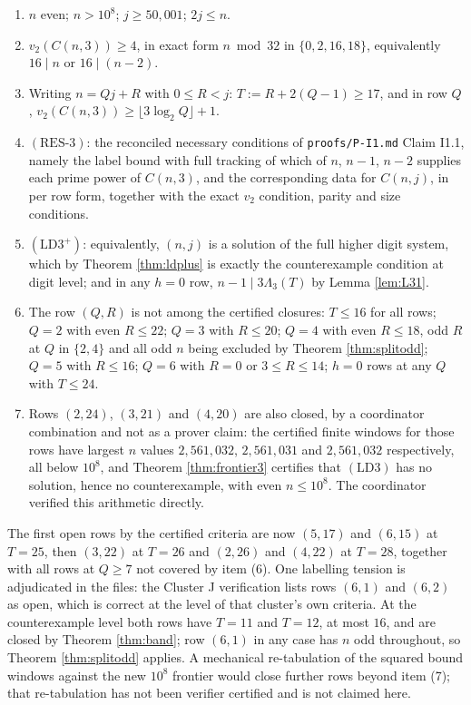 \documentclass[11pt]{article}
\theoremstyle{remark}
\newcommand{\LDthree}{\ensuremath{\mathrm{(LD3)}}}
\newcommand{\LDthreeplus}{\ensuremath{\mathrm{(LD3^+)}}}
\newcommand{\RESthree}{\ensuremath{\mathrm{(RES\text{-}3)}}}
\begin{document}
\begin{enumerate}[label=(\arabic*),leftmargin=2.5em]
\item $n$ even; $n>10^8$; $j\ge 50{,}001$; $2j\le n$.
\item $v_2(C(n,3))\ge 4$, in exact form $n\bmod 32$ in $\{0,2,16,18\}$, equivalently $16\mid n$ or $16\mid (n-2)$.
\item Writing $n=Qj+R$ with $0\le R<j$: $T:=R+2(Q-1)\ge 17$, and in row $Q$, $v_2(C(n,3))\ge \lfloor 3\log_2 Q\rfloor+1$.
\item \RESthree{}: the reconciled necessary conditions of \texttt{proofs/P-I1.md} Claim I1.1, namely the label bound with full tracking of which of $n$, $n-1$, $n-2$ supplies each prime power of $C(n,3)$, and the corresponding data for $C(n,j)$, in per row form, together with the exact $v_2$ condition, parity and size conditions.
\item \LDthreeplus{}: equivalently, $(n,j)$ is a solution of the full higher digit system, which by Theorem \ref{thm:ldplus} is exactly the counterexample condition at digit level; and in any $h=0$ row, $n-1\mid 3\Lambda_3(T)$ by Lemma \ref{lem:L31}.
\item The row $(Q,R)$ is not among the certified closures: $T\le 16$ for all rows; $Q=2$ with even $R\le 22$; $Q=3$ with $R\le 20$; $Q=4$ with even $R\le 18$, odd $R$ at $Q$ in $\{2,4\}$ and all odd $n$ being excluded by Theorem \ref{thm:splitodd}; $Q=5$ with $R\le 16$; $Q=6$ with $R=0$ or $3\le R\le 14$; $h=0$ rows at any $Q$ with $T\le 24$.
\item Rows $(2,24)$, $(3,21)$ and $(4,20)$ are also closed, by a coordinator combination and not as a prover claim: the certified finite windows for those rows have largest $n$ values $2{,}561{,}032$, $2{,}561{,}031$ and $2{,}561{,}032$ respectively, all below $10^8$, and Theorem \ref{thm:frontier3} certifies that \LDthree{} has no solution, hence no counterexample, with even $n\le 10^8$. The coordinator verified this arithmetic directly.
\end{enumerate}

The first open rows by the certified criteria are now $(5,17)$ and $(6,15)$ at $T=25$, then $(3,22)$ at $T=26$ and $(2,26)$ and $(4,22)$ at $T=28$, together with all rows at $Q\ge 7$ not covered by item (6). One labelling tension is adjudicated in the files: the Cluster J verification lists rows $(6,1)$ and $(6,2)$ as open, which is correct at the level of that cluster's own criteria. At the counterexample level both rows have $T=11$ and $T=12$, at most $16$, and are closed by Theorem \ref{thm:band}; row $(6,1)$ in any case has $n$ odd throughout, so Theorem \ref{thm:splitodd} applies. A mechanical re-tabulation of the squared bound windows against the new $10^8$ frontier would close further rows beyond item (7); that re-tabulation has not been verifier certified and is not claimed here.
\end{document}
